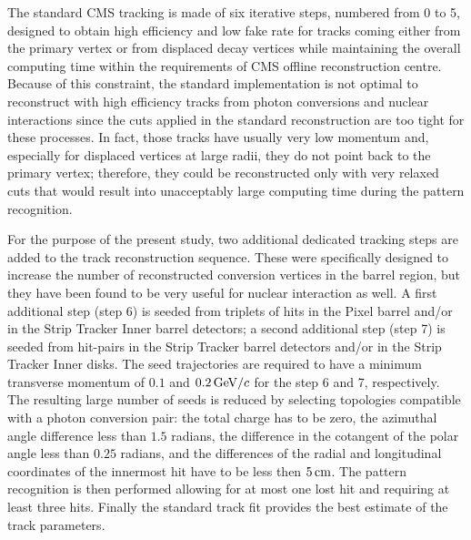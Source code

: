 \documentclass[a4paper]{jpconf}
\begin{document}
The standard CMS tracking is made of six iterative steps, numbered
from 0 to 5, designed to obtain high efficiency and low fake rate for
tracks coming either from the primary vertex or from displaced decay
vertices while maintaining the overall computing time within the
requirements of CMS offline reconstruction centre.
Because of this constraint, the standard implementation is not optimal
to reconstruct with high efficiency tracks from photon conversions and
nuclear interactions since the cuts applied in the standard
reconstruction are too tight for these processes. In fact, those
tracks have usually very low momentum and, especially for displaced
vertices at large radii, they do not point  back to the primary
vertex; therefore, they could be reconstructed only with very relaxed
cuts that would result into unacceptably large computing time during
the pattern recognition.

For the purpose of the present study, two additional dedicated
tracking steps are added to the track reconstruction sequence.
These were specifically designed to increase the number of
reconstructed conversion vertices in the barrel region,
but they have been found to be very useful for nuclear interaction as
well. A first additional step (step 6) is seeded from triplets of hits
in the Pixel barrel and/or in the Strip Tracker Inner barrel
detectors; a second additional step (step 7) is seeded from hit-pairs
in the Strip Tracker barrel detectors and/or in the Strip Tracker Inner disks.
The seed trajectories are required
to have a minimum transverse momentum of $0.1$ and $0.2{\rm \, GeV}/c$ for the
step 6 and 7, respectively. The resulting large number of seeds is
reduced by selecting topologies compatible with a photon conversion
pair: the total charge has to be zero,
the azimuthal angle difference less than $1.5$ radians, the difference
in the cotangent of the polar angle less than $0.25$ radians, and the
differences of the radial and longitudinal coordinates of the
innermost hit have to be less then $5\rm \, cm$.
The pattern recognition is then performed allowing for at most one
lost hit and requiring at least three hits. Finally the standard track
fit provides the best estimate of the track parameters.
\end{document}
